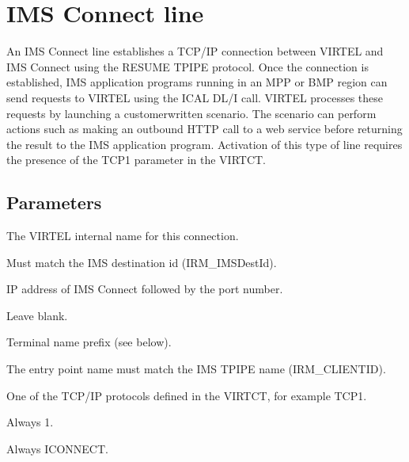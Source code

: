 \documentclass[letterpaper,10pt,english]{sphinxmanual}
\begin{document}
\newpage

\ignorespaces 

\section{IMS Connect line}
\label{\detokenize{connectivity_guide:ims-connect-line}}\label{\detokenize{connectivity_guide:index-22}}
\sphinxAtStartPar
An IMS Connect line establishes a TCP/IP connection between VIRTEL and IMS Connect using the RESUME TPIPE protocol. Once the connection is established, IMS application programs running in an MPP or BMP region can send requests to VIRTEL using the ICAL DL/I call. VIRTEL processes these requests by launching a customer\sphinxhyphen{}written scenario. The scenario can perform actions such as making an outbound HTTP call to a web service before returning the result to the IMS application program. Activation of this type of line requires the presence of the TCP1 parameter in the VIRTCT.

\sphinxAtStartPar
{}


\subsection{Parameters}
\label{\detokenize{connectivity_guide:id7}}\begin{description}
\sphinxAtStartPar
The VIRTEL internal name for this connection.

\sphinxAtStartPar
Must match the IMS destination id (IRM\_IMSDestId).

\sphinxAtStartPar
IP address of IMS Connect followed by the port number.

\sphinxAtStartPar
Leave blank.

\sphinxAtStartPar
Terminal name prefix (see below).

\sphinxAtStartPar
The entry point name must match the IMS TPIPE name (IRM\_CLIENTID).

\sphinxAtStartPar
One of the TCP/IP protocols defined in the VIRTCT, for example TCP1.

\sphinxAtStartPar
Always 1.

\sphinxAtStartPar
Always ICONNECT.

\end{description}
\end{document}
